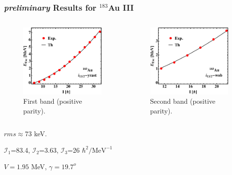 \documentclass{beamer}
\begin{document}
\begin{frame}
    \frametitle{{\tiny \emph{preliminary}} Results for $^{183}$Au III}
    \begin{columns}[c] 
     \begin{figure}
         \centering
         \includegraphics[scale=0.4]{figs/Au_183_plot1Positive.pdf}
         \caption{First band (positive parity).}
     \end{figure}
     \begin{figure}
         \centering
         \includegraphics[scale=0.4]{figs/Au_183_plot2Positive.pdf}
         \caption{Second band (positive parity).}
     \end{figure}
    \end{columns}
    \par $rms\approx73$ keV.
    \par $\mathcal{I}_1$=83.4, $\mathcal{I}_2$=3.63, $\mathcal{I}_3$=26 $\hbar^2/\text{MeV}^{-1}$
    \par $V=1.95$ MeV, $\gamma=19.7^o$
\end{frame}
\end{document}
